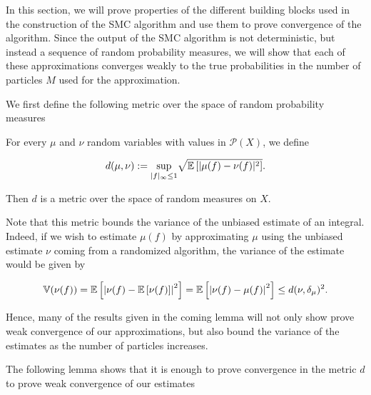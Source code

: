 In this section, we will prove properties of the different building blocks used in the construction of the SMC algorithm and use them to prove convergence of the algorithm. Since the output of the SMC algorithm is not deterministic, but instead a sequence of random probability measures, we will show that each of these approximations converges weakly to the true probabilities in the number of particles $M$ used for the approximation.

We first define the following metric over the space of random probability measures

\begin{definition}
  For every $\mu$ and $\nu$ random variables with values in $\mathcal{P}(X)$, we define

  \begin{equation*}
    d(\mu, \nu) := \underset{|f|_\infty\le1}{\text{sup}} \sqrt{\mathbb{E}\left[|\mu(f) - \nu(f)|^2\right]}.
  \end{equation*}

Then $d$ is a metric over the space of random measures on $X$.
\end{definition}

Note that this metric bounds the variance of the unbiased estimate of an integral. Indeed, if we wish to estimate $\mu(f)$ by approximating $\mu$ using the unbiased estimate $\nu$ coming from a randomized algorithm, the variance of the estimate would be given by

\begin{equation*}
  \mathbb{V}(\nu(f)) = \mathbb{E}\left[\left|\nu(f) - \mathbb{E}\left[\nu(f)\right]\right|^2\right] = \mathbb{E}\left[\left|\nu(f) - \mu(f)\right|^2\right] \le d(\nu, \delta_\mu)^2.
\end{equation*}

Hence, many of the results given in the coming lemma will not only show prove weak convergence of our approximations, but also bound the variance of the estimates as the number of particles increases.

The following lemma shows that it is enough to prove convergence in the metric $d$ to prove weak convergence of our estimates



